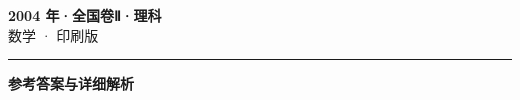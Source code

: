 \documentclass[zihao=5, a4paper]{ctexart}
\begin{document}
\begin{center}
  {\Large\bfseries 2004 年·全国卷Ⅱ·理科}\\[4pt]
  {\large 数学 · 印刷版}
\end{center}
\medskip
{}

\par\bigskip\hrule\bigskip
{}
\begin{center}{\large\bfseries 参考答案与详细解析}\end{center}
\smallskip

\end{document}
